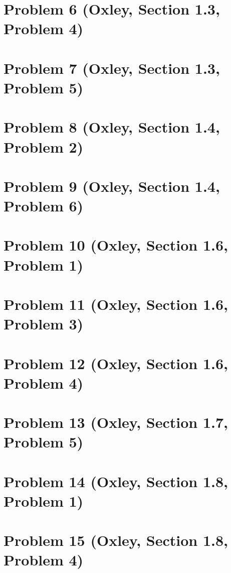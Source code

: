     \section{Problem 6 (Oxley, Section 1.3, Problem 4)}
        
        \clearpage

    \section{Problem 7 (Oxley, Section 1.3, Problem 5)}
        
        \clearpage

    \section{Problem 8 (Oxley, Section 1.4, Problem 2)}
        
        \clearpage

    \section{Problem 9 (Oxley, Section 1.4, Problem 6)}
        
        \clearpage

    \section{Problem 10 (Oxley, Section 1.6, Problem 1)}
        
        \clearpage

    \section{Problem 11 (Oxley, Section 1.6, Problem 3)}
        
        \clearpage

    \section{Problem 12 (Oxley, Section 1.6, Problem 4)}
        
        \clearpage

    \section{Problem 13 (Oxley, Section 1.7, Problem 5)}
        
        \clearpage

    \section{Problem 14 (Oxley, Section 1.8, Problem 1)}
        
        \clearpage

    \section{Problem 15 (Oxley, Section 1.8, Problem 4)}
        
        \clearpage
    